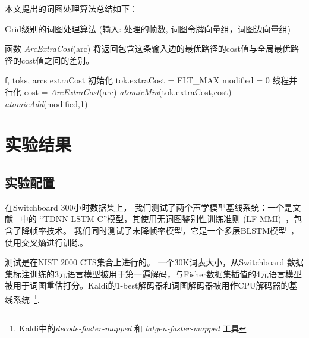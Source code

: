 本文提出的词图处理算法总结如下：
 \vspace{-0.25em}
 \begin{algorithm}[ht]
 \caption{Grid级别的词图处理算法  \textcolor[rgb]{0,0.5,0}{(输入: 处理的帧数, 词图令牌向量组，词图边向量组)}}
 \label{code:exact-lattice}
 \begin{flushleft}
  函数 {\em{ArcExtraCost}}(arc) 将返回包含这条输入边的最优路径的cost值与全局最优路径的cost值之间的差别。
 \end{flushleft}
 \begin{algorithmic}[1]
  {f, toks, arcs}
  \Comment \textcolor[rgb]{0.8,0,0}{extraCost 初始化}
 \State tok.extraCost = FLT\_MAX
 \EndFor
 \State  modified = 0
  \Comment \textcolor[rgb]{0.8,0,0}{线程并行化 }
 \State cost = \textit{ArcExtraCost}(arc)
 \State \textit{atomicMin}(tok.extraCost,cost)
 \State \textit{atomicAdd}(modified,1)
 \EndIf
 \EndFor
 \EndWhile
 \EndProcedure
 \end{algorithmic}
 \end{algorithm}

\section{实验结果}
\label{chap:gpu-exp}

\subsection{实验配置}
在Switchboard 300小时数据集上，
我们测试了两个声学模型基线系统：一个是文献 ~\cite{peddinti2018low}中的 ``TDNN-LSTM-C''模型，其使用无词图鉴别性训练准则 (LF-MMI)~\cite{povey2016purely}，包含了降帧率技术。
我们同时测试了未降帧率模型，它是一个多层BLSTM模型~\cite{sak2014long}，使用交叉熵进行训练。%

测试是在NIST 2000 CTS集合上进行的。
一个30K词表大小，从Switchboard 数据集标注训练的3元语言模型被用于第一遍解码，与Fisher数据集插值的4元语言模型被用于词图重估打分。Kaldi的1-best解码器和词图解码器被用作CPU解码器的基线系统~\footnote{Kaldi中的{\em{decode-faster-mapped}} 和 {\em{latgen-faster-mapped}} 工具}.

